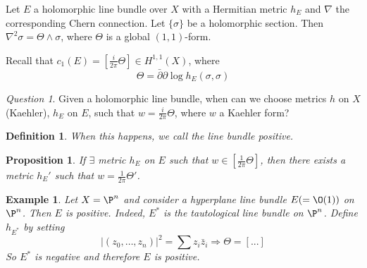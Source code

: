 \documentclass[A4paper, british]{amsart}
\theoremstyle{darkgreentheorem}
\newtheorem{prop}[thm]{Proposition}
\theoremstyle{darkbluedefinition}
\newtheorem{defn}[thm]{Definition}
\theoremstyle{darkredexample}
\newtheorem{exa}[thm]{Example}
\theoremstyle{remark}
\newtheorem{q}[thm]{Question}
\newcommand{\1}{\mathbbm{1}}
\begin{document}
Let $E$ a holomorphic line bundle over $X$ with a Hermitian metric $h_{E}$ and $\nabla$ the corresponding Chern connection.
Let $\{\sigma \}$ be a holomorphic section.
Then $\nabla^{2}\sigma=\Theta \wedge \sigma $, where $\Theta $ is a global $(1,1)$-form.

Recall that $c_{1}(E)=[\frac{i}{2\pi}\Theta ]\in H^{1,1}(X)$, where
\[ \Theta=\bar{\partial}\partial \log h_{E}(\sigma, \sigma) \]

\begin{q}
    Given a holomorphic line bundle, when can we choose metrics $h$ on $X$ (Kaehler), $h_{E}$ on $E$, such that $w=\frac{i}{2\pi}\Theta $, where $w$ a Kaehler form?
\end{q}

\begin{defn}
    When this happens, we call the line bundle \textit{positive}.
\end{defn}

\begin{prop}
    If $\exists$ metric $h_{E}$ on $E$ such that $w\in [\frac{1}{2\pi}\Theta ]$, then there exists a metric $h_{E}'$ such that $w=\frac{1}{2\pi}\Theta'$.
\end{prop}

\begin{exa}
    Let $X=\P^{n}$ and consider a hyperplane line bundle $E(=\O(1))$ on $\P^{n}$.
    Then $E$ is positive.
    Indeed, $E^{*}$ is the tautological line bundle on $\P^{n}$.
    Define $h_{E^{*}}$ by setting
    \[ |(z_{0},\ldots,z_{n})|^{2}=\sum z_{i}\bar{z}_{i} \Rightarrow \Theta= [...]\]
    So $E^{*}$ is negative and therefore $E$ is positive.
\end{exa}
\end{document}
